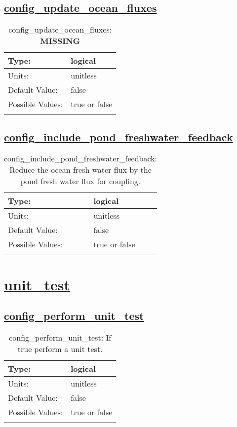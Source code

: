 \subsection[config\_update\_ocean\_fluxes]{\hyperref[sec:nm_tab_forcing]{config\_update\_ocean\_fluxes}}
\label{subsec:nm_sec_config_update_ocean_fluxes}
\begin{center}
\begin{longtable}{| p{2.0in} || p{4.0in} |}
    \hline
    Type: & logical \\
    \hline
    Units: & \si{unitless} \\
    \hline
    Default Value: & false \\
    \hline
    Possible Values: & true or false \\
    \hline
    \caption{config\_update\_ocean\_fluxes: {\bf \color{red} MISSING}}
\end{longtable}
\end{center}
\subsection[config\_include\_pond\_freshwater\_feedback]{\hyperref[sec:nm_tab_forcing]{config\_include\_pond\_freshwater\_feedback}}
\label{subsec:nm_sec_config_include_pond_freshwater_feedback}
\begin{center}
\begin{longtable}{| p{2.0in} || p{4.0in} |}
    \hline
    Type: & logical \\
    \hline
    Units: & \si{unitless} \\
    \hline
    Default Value: & false \\
    \hline
    Possible Values: & true or false \\
    \hline
    \caption{config\_include\_pond\_freshwater\_feedback: Reduce the ocean fresh water flux by the pond fresh water flux for coupling.}
\end{longtable}
\end{center}
\section[unit\_test]{\hyperref[sec:nm_tab_unit_test]{unit\_test}}
\label{sec:nm_sec_unit_test}
\subsection[config\_perform\_unit\_test]{\hyperref[sec:nm_tab_unit_test]{config\_perform\_unit\_test}}
\label{subsec:nm_sec_config_perform_unit_test}
\begin{center}
\begin{longtable}{| p{2.0in} || p{4.0in} |}
    \hline
    Type: & logical \\
    \hline
    Units: & \si{unitless} \\
    \hline
    Default Value: & false \\
    \hline
    Possible Values: & true or false \\
    \hline
    \caption{config\_perform\_unit\_test: If true perform a unit test.}
\end{longtable}
\end{center}
